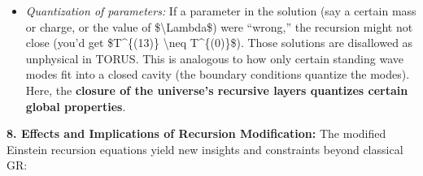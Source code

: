 \documentclass[]{article}
\begin{document}
\begin{itemize}
\item
  \emph{Quantization of parameters:} If a parameter in the solution (say
  a certain mass or charge, or the value of \$\textbackslash{}Lambda\$)
  were ``wrong,'' the recursion might not close (you'd get
  \$T\^{}\{(13)\} \textbackslash{}neq T\^{}\{(0)\}\$). Those solutions
  are disallowed as unphysical in TORUS. This is analogous to how only
  certain standing wave modes fit into a closed cavity (the boundary
  conditions quantize the modes). Here, the \textbf{closure of the
  universe's recursive layers quantizes certain global properties}.
\end{itemize}

\textbf{8. Effects and Implications of Recursion Modification:} The
modified Einstein recursion equations yield new insights and constraints
beyond classical GR:
\end{document}
